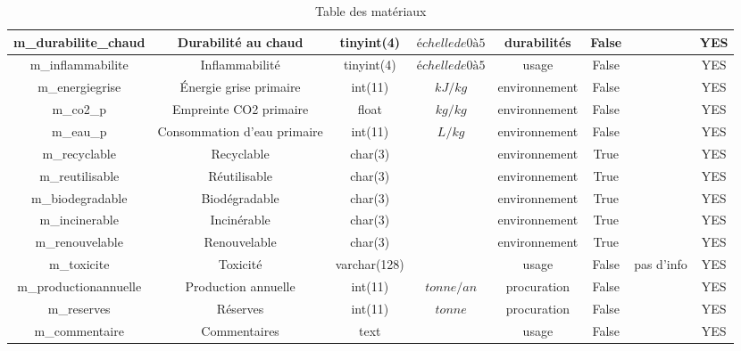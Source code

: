 \documentclass[12pt,a4paper]{article}
\begin{document}
\begin{table}
\begin{center}
\begin{tabular}{|c|c|c|c|c|c|c|c|}
                \hline
                m\_durabilite\_chaud & Durabilité au chaud & tinyint(4) & $échelle de 0 à 5$ & durabilités & False &  & YES \\
                \hline
                m\_inflammabilite & Inflammabilité & tinyint(4) & $échelle de 0 à 5$ & usage & False &  & YES \\
                \hline
                m\_energiegrise & Énergie grise primaire & int(11) & $kJ/kg$ & environnement & False &  & YES \\
                \hline
                m\_co2\_p & Empreinte CO2 primaire & float & $kg/kg$ & environnement & False &  & YES \\
                \hline
                m\_eau\_p & Consommation d'eau primaire & int(11) & $L/kg$ & environnement & False &  & YES \\
                \hline
                m\_recyclable & Recyclable & char(3) & $ $ & environnement & True &  & YES \\
                \hline
                m\_reutilisable & Réutilisable & char(3) & $ $ & environnement & True &  & YES \\
                \hline
                m\_biodegradable & Biodégradable & char(3) & $ $ & environnement & True &  & YES \\
                \hline
                m\_incinerable & Incinérable & char(3) & $ $ & environnement & True &  & YES \\
                \hline
                m\_renouvelable & Renouvelable & char(3) & $ $ & environnement & True &  & YES \\
                \hline
                m\_toxicite & Toxicité & varchar(128) & $ $ & usage & False & pas d'info & YES \\
                \hline
                m\_productionannuelle & Production annuelle & int(11) & $tonne/an$ & procuration & False &  & YES \\
                \hline
                m\_reserves & Réserves & int(11) & $tonne$ & procuration & False &  & YES \\
                \hline
                m\_commentaire & Commentaires & text & $ $ & usage & False &  & YES \\
                \hline
            \end{tabular}
        \end{center}
        \caption{Table des matériaux}
    \end{table}
            
\end{document}
